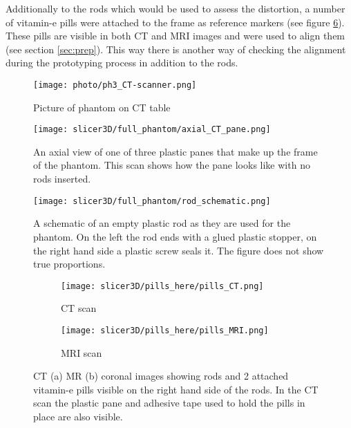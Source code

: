 Additionally to the rods which would be used to assess the distortion, a number of vitamin-e pills were attached to the frame as reference markers (see figure \ref{fig:pills}).
These pills are visible in both CT and MRI images and were used to align them (see section \ref{sec:prep}).
This way there is another way of checking the alignment during the prototyping process in addition to the rods.


\begin{figure}[!bp]
\centering
\texttt{[image: photo/ph3\_CT-scanner.png]}
\caption{Picture of phantom on CT table}
\label{fig:photo_ph3}
\end{figure}

\begin{figure}[!tbp]
\centering
\texttt{[image: slicer3D/full\_phantom/axial\_CT\_pane.png]}
\caption{An axial view of one of three plastic panes that make up the frame of the phantom. This scan shows how the pane looks like with no rods inserted.}
\label{fig:axial_CT_pane}
\end{figure}

\begin{figure}[!tbp]
\centering
\texttt{[image: slicer3D/full\_phantom/rod\_schematic.png]}
\caption{A schematic of an empty plastic rod as they are used for the phantom. On the left the rod ends with a glued plastic stopper, on the right hand side a plastic screw seals it. The figure does not show true proportions.}
\label{fig:rod_schematic}
\end{figure}


\begin{figure}[!thb]
\centering
  \begin{subfigure}[b]{0.45\textwidth}
  \centering
    \texttt{[image: slicer3D/pills\_here/pills\_CT.png]}
    \caption{CT scan}
    \label{fig:pills_CT}
  \end{subfigure}
  \begin{subfigure}[b]{0.45\textwidth}
  \centering
      \texttt{[image: slicer3D/pills\_here/pills\_MRI.png]}
    \caption{MRI scan}
    \label{fig:pills_MR}
  \end{subfigure}
  \caption{CT (a) MR (b) coronal images showing rods and 2 attached vitamin-e pills visible on the right hand side of the rods. In the CT scan the plastic pane and adhesive tape used to hold the pills in place are also visible.}
  \label{fig:pills}
\end{figure}

\clearpage

